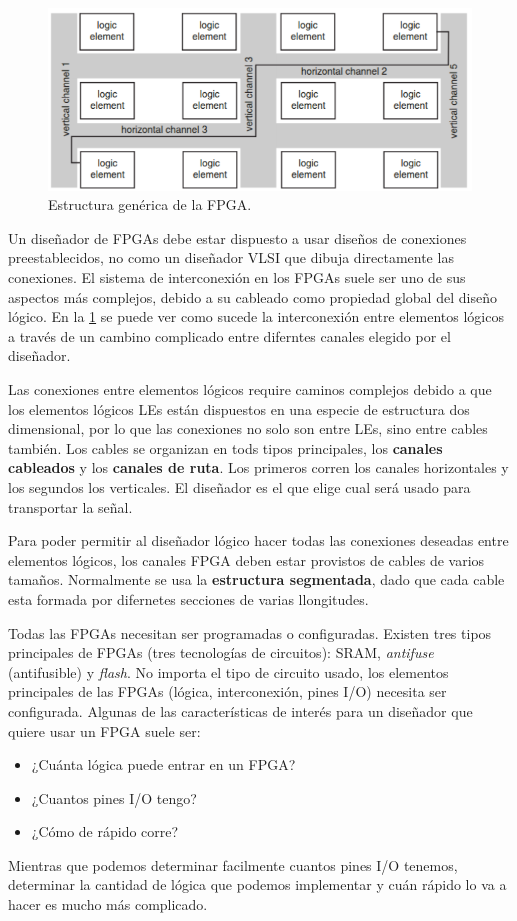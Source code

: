 \begin{figure}[H] \centering
    \includegraphics[width=0.6\linewidth]{Imagenes/03-FPGA_Interconexion.png} 
    \caption{Estructura genérica de la FPGA.}   
    \label{Fig:03-FPGA_Interconexion}
\end{figure}
Un diseñador de FPGAs debe estar dispuesto a usar diseños de conexiones preestablecidos, no como un diseñador VLSI que dibuja directamente las conexiones. El sistema de interconexión en los FPGAs suele ser uno de sus aspectos más complejos, debido a su cableado como propiedad global del diseño lógico. En la \cref{Fig:03-FPGA_Interconexion} se puede ver como sucede la interconexión entre elementos lógicos a través de un cambino complicado entre diferntes canales elegido por el diseñador.

Las conexiones entre elementos lógicos require caminos complejos debido a que los elementos lógicos LEs están dispuestos en una especie de estructura dos dimensional, por lo que las conexiones no solo son entre LEs, sino entre cables también. Los cables se organizan en tods tipos principales, los \textbf{canales cableados} y los \textbf{canales de ruta}. Los primeros corren los canales horizontales y los segundos los verticales. El diseñador es el que elige cual será usado para transportar la señal. 

Para poder permitir al diseñador lógico hacer todas las conexiones deseadas entre elementos lógicos, los canales FPGA deben estar provistos de cables de varios tamaños. Normalmente se usa la \textbf{estructura segmentada}, dado que cada cable esta formada por difernetes secciones de varias llongitudes. 

Todas las FPGAs necesitan ser programadas o configuradas. Existen tres tipos principales de FPGAs (tres tecnologías de circuitos): SRAM, \textit{antifuse} (antifusible) y \textit{flash}. No importa el tipo de circuito usado, los elementos principales de las FPGAs (lógica, interconexión, pines I/O) necesita ser configurada. Algunas de las características de interés para un diseñador que quiere usar un FPGA suele ser: 

\begin{itemize}
    \item ¿Cuánta lógica puede entrar en un FPGA? 
    \item ¿Cuantos pines I/O tengo? 
    \item ¿Cómo de rápido corre? 
\end{itemize}
Mientras que podemos determinar facilmente cuantos pines I/O tenemos, determinar la cantidad de lógica que podemos implementar y cuán rápido lo va a hacer es mucho más complicado. 



